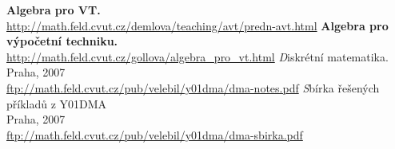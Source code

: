 \documentclass{article}
\begin{document}
\begin{thebibliography}{9}
               {\bf Algebra pro VT.} \\ 
	       \url{http://math.feld.cvut.cz/demlova/teaching/avt/predn-avt.html}
               {\bf Algebra pro výpočetní techniku.} \\ 
	       \url{http://math.feld.cvut.cz/gollova/algebra_pro_vt.html}
               {\emph Diskrétní matematika.} \\ 
		Praha,
		2007 \\
	       \url{ftp://math.feld.cvut.cz/pub/velebil/y01dma/dma-notes.pdf}
               {\emph Sbírka řešených příkladů z Y01DMA} \\ 
		Praha,
		2007 \\
	       \url{ftp://math.feld.cvut.cz/pub/velebil/y01dma/dma-sbirka.pdf}
             
\end{thebibliography}
\end{document}
